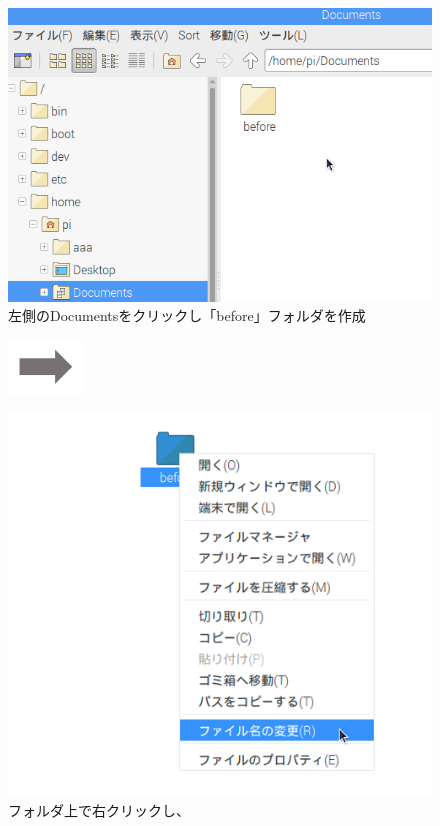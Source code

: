 \begin{figure}[ht]
  \begin{minipage}{0.4\textwidth}
    \includegraphics[width=\linewidth]{text01-img/textbook-img058.png}
     左側のDocumentsをクリックし「before」フォルダを作成
  \end{minipage}
  \includegraphics[width=2cm]{text01-img/textbook-img052.png}
  \begin{minipage}{0.4\textwidth}
    \includegraphics[width=\linewidth]{text01-img/textbook-img057.png}
     フォルダ上で右クリックし、


\end{minipage}
\end{figure}
